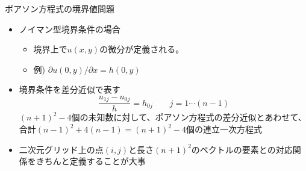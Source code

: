 \begin{frame}[t,fragile]{ポアソン方程式の境界値問題}
  \begin{itemize}
  \item ノイマン型境界条件の場合
    \begin{itemize}
    \item 境界上で$u(x,y)$の微分が定義される。
    \item 例) $\partial u(0,y) / \partial x = h(0,y)$
    \end{itemize}
  \item 境界条件を差分近似で表す
    \[
    \frac{u_{1j} - u_{0j}}{h} = h_{0j} \qquad j=1 \cdots (n-1)
    \]
    $(n+1)^2-4$個の未知数に対して、ポアソン方程式の差分近似とあわせて、合計$(n-1)^2+4(n-1)=(n+1)^2-4$個の連立一次方程式 \\[2em]
  \item 二次元グリッド上の点$(i,j)$と長さ$(n+1)^2$のベクトルの要素との対応関係をきちんと定義することが大事
  \end{itemize}
\end{frame}

